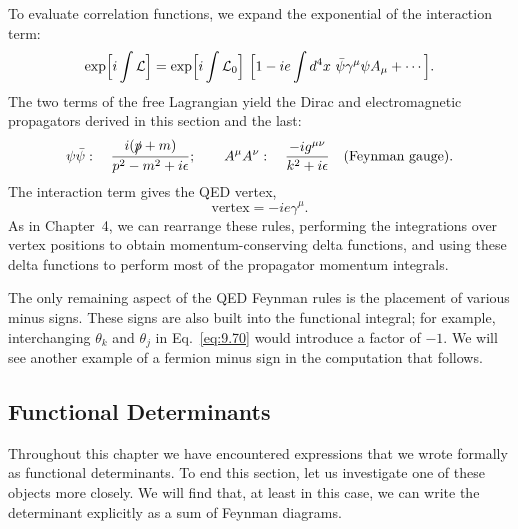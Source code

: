 To evaluate correlation functions, we expand the exponential of the
interaction term:
\begin{equation}
  \exp\Bigl[ i\int \mathcal{L} \Bigr] = \exp\Bigl[ i\int \mathcal{L}_0 \Bigr]\
    \Bigl[ 1 - ie\int d^4x\ \bar{\psi}\gamma^\mu\psi A_\mu + \cdots \Bigr] .
\end{equation}
The two terms of the free Lagrangian yield the Dirac and electromagnetic
propagators derived in this section and the last:
\begin{equation}
  \psi\bar{\psi}: \quad \frac{i(\slashed{p}+m)}{p^2-m^2+i\epsilon};\qquad
  A^\mu A^\nu: \quad \frac{-ig^{\mu\nu}}{k^2+i\epsilon}
    \quad \text{(Feynman gauge)} .
\end{equation}
The interaction term gives the QED vertex,
\begin{equation}
  \text{vertex} = -ie\gamma^\mu .
\end{equation}
As in Chapter~4, we can rearrange these rules, performing the integrations
over vertex positions to obtain momentum-conserving delta functions, and using
these delta functions to perform most of the propagator momentum integrals.

The only remaining aspect of the QED Feynman rules is the placement of various
minus signs.  These signs are also built into the functional integral; for
example, interchanging $\theta_k$ and $\theta_j$ in Eq.~\eqref{eq:9.70} would
introduce a factor of $-1$.  We will see another example of a fermion minus
sign in the computation that follows.

\subsection{Functional Determinants}

Throughout this chapter we have encountered expressions that we wrote
formally as functional determinants.  To end this section, let us investigate
one of these objects more closely.  We will find that, at least in this case,
we can write the determinant explicitly as a sum of Feynman diagrams.

